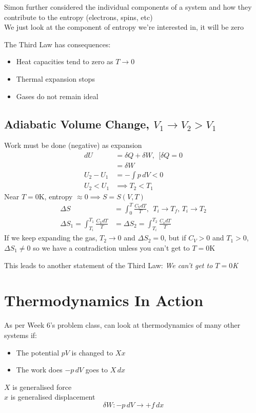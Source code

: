 \documentclass[a4paper, 11pt, normalem]{report}
\begin{document}
Simon further considered the individual components of a system and how they contribute to the entropy (electrons, spins, etc) \\
We just look at the component of entropy we're interested in, it will be zero

The Third Law has consequences:
\begin{itemize}
    \item Heat capacities tend to zero as $T \to 0$
    \item Thermal expansion stops
    \item Gases do not remain ideal
\end{itemize}

\subsection{Adiabatic Volume Change, $V_1 \to V_2 > V_1$}
Work must be done (negative) as expansion
\begin{align*}
    dU &= \delta Q + \delta W, ~~[\delta Q = 0 \\
    &= \delta W \\
    U_2 - U_1 &= -\int p\,dV < 0 \\
    U_2 < U_1 &\implies T_2 < T_1
\end{align*}
Near $T = 0$K, entropy $\approx 0 \implies S = S(V, T)$
\begin{align*}
    \Delta S &= \int_{0}^{T} \frac{C_V dT}{T},~~ T_i \to T_f,\,T_i \to T_2 \\
    \Delta S_1 = \int_{T_i}^{T_1} \frac{C_V dT}{T} &= \Delta S_2 = \int_{T_i}^{T_2} \frac{C_v dT}{T}
\end{align*}
If we keep expanding the gas, $T_2 \to 0$ and $\Delta S_2 = 0$, but if $C_V > 0$ and $T_1 > 0$, $\Delta S_1 \neq 0$ so we have a contradiction unless you can't get to $T = 0$K

This leads to another statement of the Third Law: \emph{We can't get to $T = 0$K}

\section{Thermodynamics In Action}
As per Week 6's problem class, can look at thermodynamics of many other systems if:
\begin{itemize}
    \item The potential $pV$ is changed to $Xx$
    \item The work does $-p\,dV$ goes to $X\,dx$
\end{itemize}
$X$ is generalised force \\
$x$ is generalised displacement
\begin{equation*}
    \delta W: -p\,dV \to +f\,dx
\end{equation*}
\end{document}
